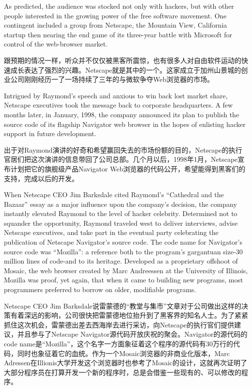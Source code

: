 \ifdefined\eng
As predicted, the audience was stocked not only with hackers, but with other people interested in the growing power of the free software movement. One contingent included a group from Netscape, the Mountain View, California startup then nearing the end game of its three-year battle with Microsoft for control of the web-browser market.
\fi

\ifdefined\chs
跟预期的情况一样，听众并不仅仅被黑客所震惊，也有很多人对自由软件运动的快速成长表达了强烈的兴趣。Netscape就是其中的一个。这家成立于加州山景城的创业公司刚刚经历一了一场持续了三年的与微软争夺Web浏览器的市场。
\fi

\ifdefined\eng
Intrigued by Raymond's speech and anxious to win back lost market share, Netscape executives took the message back to corporate headquarters. A few months later, in January, 1998, the company announced its plan to publish the source code of its flagship Navigator web browser in the hopes of enlisting hacker support in future development.
\fi

\ifdefined\chs
出于对Raymond演讲的好奇和希望赢回失去的市场份额的目的，Netscape的执行官居们把这次演讲的信息带回了公司总部。几个月以后，1998年1月，Netscape宣布计划把它的旗舰级产品Navigator Web浏览器的代码公开，希望能得到黑客们的支持，完成以后的开发。
\fi

\ifdefined\eng
When Netscape CEO Jim Barksdale cited Raymond's ``Cathedral and the Bazaar'' essay as a major influence upon the company's decision, the company instantly elevated Raymond to the level of hacker celebrity. Determined not to squander the opportunity, Raymond traveled west to deliver interviews, advise Netscape executives, and take part in the eventual party celebrating the publication of Netscape Navigator's source code. The code name for Navigator's source code was ``Mozilla'': a reference both to the program's gargantuan size-30 million lines of code-and to its heritage. Developed as a proprietary offshoot of Mosaic, the web browser created by Marc Andreessen at the University of Illinois, Mozilla was proof, yet again, that when it came to building new programs, most programmers preferred to borrow on older, modifiable programs.
\fi

\ifdefined\chs
Netscape CEO Jim Barksdale说雷蒙德的``教堂与集市''文章对于公司做出这样的决策有着深远的影响，公司很快把雷蒙德地位抬升到了黑客界的知名人士。为了紧紧抓住这次机会，雷蒙德出差去西海岸去进行采访，向Netscape的执行官们提供建议，并且参与了Netscape Navigator源代码开放庆祝的聚会。Navigator的源代码的code name是``Mozilla''，这个名字一方面象征着这个程序的源代码有30万行的代码，同时也象征着它的血统。作为一个Mosaic浏览器的非商业化版本，Marc Adressen在Illionis大学开发这个浏览器时也参考了Mosaic的设计，这就再次证明了大部分程序员在打算开发一个新的程序时，总是会借鉴一些现有的、可以修改的程序。
\fi

